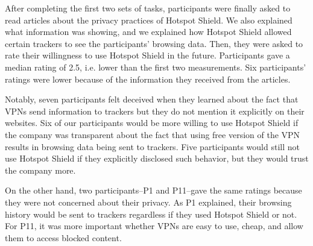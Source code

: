 After completing the first two sets of tasks, participants were finally asked to read articles
about the privacy practices of Hotspot Shield. We also explained what information \tool was showing, and we explained how Hotspot Shield allowed certain trackers to see the participants' browsing data. Then, they were asked to rate
their willingness to use Hotspot Shield in the future. Participants gave a median rating
of 2.5, i.e. lower than the first two measurements. Six participants' ratings were
lower because of the information they received from the articles.

Notably, seven participants felt deceived when they learned about the fact that
VPNs send information to trackers but they do not mention it explicitly on
their websites. Six of our participants would be more willing to use Hotspot Shield
if the company was transparent about the fact that using free version of the VPN
results in browsing data being sent to trackers.  Five participants would still not use Hotspot Shield if they explicitly disclosed such behavior, but they would trust the company more.

On the other hand, two participants--P1 and P11--gave the same ratings because they were not concerned about their privacy. As P1 explained, their browsing history would be sent to trackers regardless if they used Hotspot Shield or not.
For P11, it was more important whether VPNs are easy to use, cheap, and allow
them to access blocked content. 



% 

